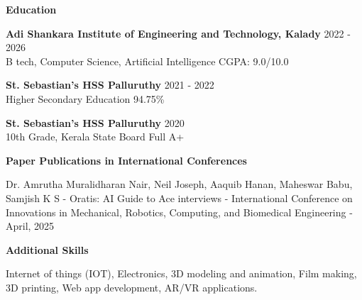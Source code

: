 \documentclass{article}
\newcommand{\resumesection}[1]{
  \vspace{10pt}
  {\RaggedRight\Large\textbf{#1}}
  \par\vspace{5pt}
}
\newcommand{\resumesubsection}[2]{
  \textbf{#1} \hfill #2 \\
}
\begin{document}
\resumesection{Education}
\resumesubsection{\textbf{Adi Shankara Institute of Engineering and Technology, Kalady}}{2022 - 2026}
B tech, Computer Science, Artificial Intelligence \hfill CGPA: 9.0/10.0

\resumesubsection{\textbf{St. Sebastian's HSS Palluruthy}}{2021 - 2022}
Higher Secondary Education \hfill 94.75\%

\resumesubsection{\textbf{St. Sebastian's HSS Palluruthy}}{2020}
10th Grade, Kerala State Board \hfill Full A+

\resumesection{Paper Publications in International Conferences}
Dr. Amrutha Muralidharan Nair, Neil Joseph, Aaquib Hanan, Maheswar Babu, Samjish K S - Oratis: AI Guide to Ace interviews - International Conference on Innovations in Mechanical, Robotics, Computing, and Biomedical Engineering - April, 2025

\resumesection{Additional Skills}
Internet of things (IOT), Electronics, 3D modeling and animation, Film making, 3D printing, Web app development, AR/VR applications.
\end{document}
